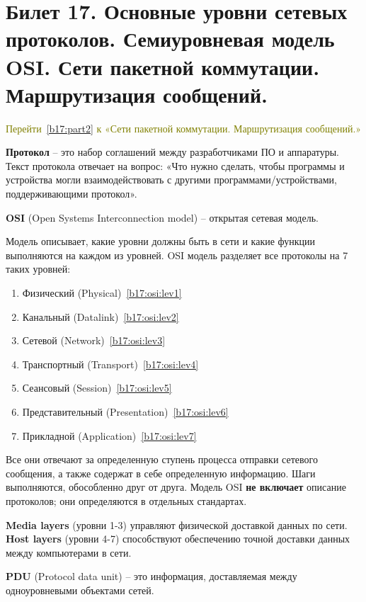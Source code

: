 \newpage
\section{Билет 17. Основные уровни сетевых протоколов. Семиуровневая модель OSI. Сети пакетной коммутации. Маршрутизация сообщений.}\label{b17:part1}

\textcolor{olive}{Перейти~\ref{b17:part2} к «Сети пакетной коммутации. Маршрутизация сообщений.»}

\textbf{Протокол} -- это набор соглашений между разработчиками ПО и аппаратуры. Текст протокола отвечает на вопрос: «Что нужно сделать, чтобы программы и устройства могли взаимодействовать с другими программами/устройствами, поддерживающими протокол».

\textbf{OSI} (Open Systems Interconnection model) -- открытая сетевая модель.

Модель описывает, какие уровни должны быть в сети и какие функции выполняются на каждом из уровней. OSI модель разделяет все протоколы на 7 таких уровней:
\begin{enumerate}
\item Физический (Physical)~\ref{b17:osi:lev1}
\item Канальный (Datalink)~\ref{b17:osi:lev2}
\item Сетевой (Network)~\ref{b17:osi:lev3}
\item Транспортный (Transport)~\ref{b17:osi:lev4}
\item Сеансовый (Session)~\ref{b17:osi:lev5}
\item Представительный (Presentation)~\ref{b17:osi:lev6}
\item Прикладной (Application)~\ref{b17:osi:lev7}
\end{enumerate}

Все они отвечают за определенную ступень процесса отправки сетевого сообщения, а также содержат в себе определенную информацию. Шаги выполняются, обособленно друг от друга. Модель OSI \textbf{не включает} описание протоколов; они определяются в отдельных стандартах.

\textbf{Media layers} (уровни 1-3) управляют физической доставкой данных по сети. \\
\textbf{Host layers} (уровни 4-7) способствуют обеспечению точной доставки данных между компьютерами в сети.

\textbf{PDU} (Protocol data unit) -- это информация, доставляемая между одноуровневыми объектами сетей.

